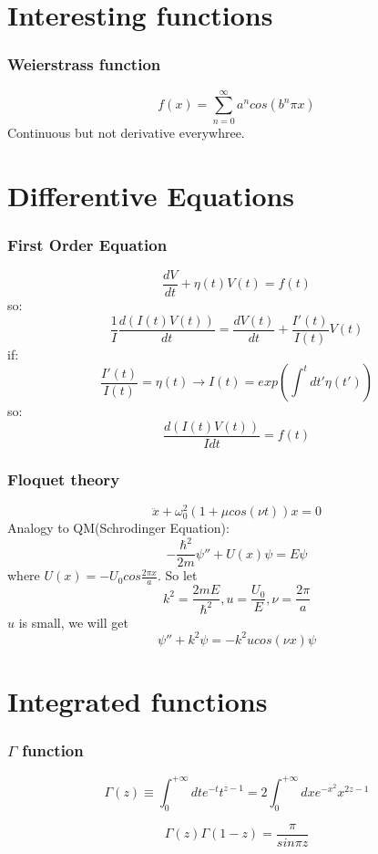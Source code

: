 \documentclass[11pt,a4paper]{report}
\begin{document}
\section{Interesting functions}

\subsubsection{Weierstrass function}
\begin{equation}
    f(x) = \sum_{n=0}^{\infty}a^{n}cos(b^{n}\pi x)
\end{equation}
Continuous but not derivative everywhree.


\section{Differentive Equations}

\subsubsection{First Order Equation}
$$ \frac{dV}{dt} + \eta(t)V(t) = f(t)  $$
so:
$$\frac{1}{I}\frac{d(I(t)V(t))}{dt} = \frac{dV(t)}{dt} +
\frac{I'(t)}{I(t)}V(t)$$
if: 
$$ \frac{I'(t)}{I(t)} = \eta(t)	\rightarrow I(t) =
exp(\int^{t}dt'\eta(t'))$$
so:
$$ \frac{d(I(t)V(t))}{I dt} = f(t)$$

\subsubsection{Floquet theory}
\begin{equation}
    \ddot{x} + \omega_{0}^{2}(1+\mu cos(\nu t))x = 0
\end{equation}
Analogy to QM(Schrodinger Equation):	\\
$$-\frac{\hbar^{2}}{2m}{\psi''} + U(x)\psi = E\psi$$ 
where $U(x) = -U_{0}cos\frac{2\pi x}{a}$.
So let 
$$k^{2} = \frac{2mE}{\hbar^{2}}, u=\frac{U_0}{E}, \nu=\frac{2\pi}{a}$$ 
$u$ is small, we will get   
$$ \psi''+k^{2}\psi = -k^{2}ucos(\nu x)\psi$$

\section{Integrated functions}
\subsubsection{$\Gamma$ function}
$$\Gamma(z) \equiv \int_{0}^{+\infty}dt e^{-t} t^{z-1} =
2\int_{0}^{+\infty}dx e^{-x^2}x^{2z-1}$$

$$\Gamma(z)\Gamma(1-z) = \frac{\pi}{sin\pi z}$$
\end{document}
